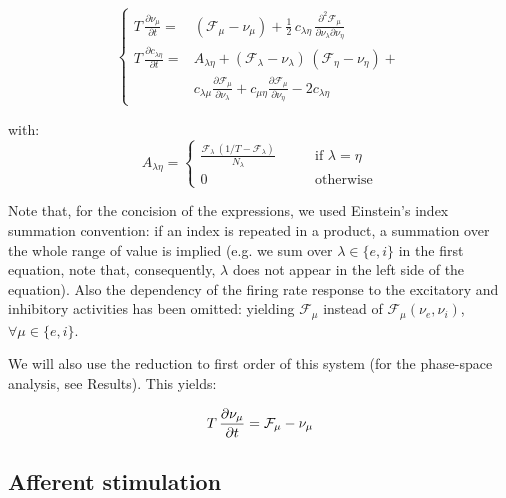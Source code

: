\documentclass[8pt, colorlinks, a4paper]{article}
\begin{document}
\begin{equation}
\label{eq:master-equation}
\left\{
\begin{split}
T \, \frac{\partial \nu_\mu}{\partial t} = & (\mathcal{F}_\mu - \nu_\mu )
   + \frac{1}{2} \, c_{\lambda \eta} \, 
\frac{\partial^2 \mathcal{F}_\mu}{\partial \nu_\lambda \partial \nu_\eta} \\
T \, \frac{\partial c_{\lambda \eta} }{\partial t}  =  & A_{\lambda \eta} +
(\mathcal{F}_\lambda - \nu_\lambda ) \, (\mathcal{F}_\eta - \nu_\eta ) + \\
 & c_{\lambda \mu} \frac{\partial \mathcal{F}_\mu}{\partial \nu_\lambda} +
 c_{\mu \eta} \frac{\partial \mathcal{F}_\mu}{\partial \nu_\eta} 
 - 2  c_{\lambda \eta}
\end{split}
\right.
\end{equation}

with:
\begin{equation}
A_{\lambda \eta} =  
\left\{
\begin{split}
\frac{\mathcal{F}_\lambda \, (1/T - \mathcal{F}_\lambda)}{N_\lambda} 
\qquad & \textrm{if  } \lambda=\eta \\
0 \qquad & \textrm{otherwise}
\end{split}
\right.
\end{equation}

Note that, for the concision of the expressions, we used Einstein's
index summation convention: if an index is repeated in a product, a
summation over the whole range of value is implied (e.g. we sum over
\(\lambda \in \{e,i\} \) in the first equation, note that,
consequently, \(\lambda\) does not appear in the left side of the
equation). Also the dependency of the firing rate response to the
excitatory and inhibitory activities has been omitted: yielding
\(\mathcal{F}_\mu\) instead of \(\mathcal{F}_\mu(\nu_e,\nu_i)\),
\(\forall \mu \in \{e,i\} \).

We will also use the reduction to first order of this system (for the
phase-space analysis, see Results). This yields:

\begin{equation}
\label{eq:master-eq-1st-order}
T \, \frac{\partial \nu_\mu}{\partial t} = \mathcal{F}_\mu - \nu_\mu \\
\end{equation}

\subsection{Afferent stimulation}
\label{sec-3-8}
\end{document}

